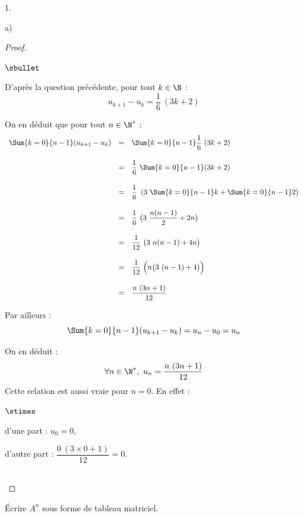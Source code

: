 \begin{noliste}{1.}
\begin{noliste}{a)}
    \begin{proof}~%
      \begin{noliste}{$\sbullet$}
      \item D'après la question précédente, pour tout $k \in \N$ :
        \[
        u_{k+1} - u_k = \dfrac{1}{6} \ (3k + 2)
        \]
      \item On en déduit que pour tout $n \in \N^*$ : 
        \[
        \begin{array}{rcl}
          \Sum{k=0}{n-1} (u_{k+1} - u_k) & = & \Sum{k=0}{n-1}
          \dfrac{1}{6} \ (3k + 2) 
          \\[.6cm]
          & = & \dfrac{1}{6} \ \Sum{k=0}{n-1} (3k + 2) 
          \\[.6cm]
          & = & \dfrac{1}{6} \ \left(3 \ \Sum{k=0}{n-1} k +
            \Sum{k=0}{n-1} 2 \right) 
          \\[.6cm]
          & = & \dfrac{1}{6} \ \big(3 \ \dfrac{n(n-1)}{2} + 2 n \big) 
          \\[.6cm]
          & = & \dfrac{1}{12} \ \big(3 \ n(n-1) + 4 n \big) 
          \\[.6cm]
          & = & \dfrac{1}{12} \ \Big( n \big(3 \ (n-1) + 4 \big) \Big) 
          \\[.6cm]
          & = & \dfrac{n \ (3n+1)}{12}
        \end{array}
        \]
      \item Par ailleurs :  
        \[
        \Sum{k=0}{n-1} (u_{k+1} - u_k) = u_n - u_0 = u_n
        \]        
      \item On en déduit : 
        \[ 
        \forall n \in \N^*, \ u_n = \dfrac{n \ (3n+1)}{12}
        \] 
        Cette relation est aussi vraie pour $n = 0$. En effet :
        \begin{noliste}{$\stimes$}
        \item d'une part : $u_0 = 0$,
        \item d'autre part : $\dfrac{0 \ (3 \times 0+1)}{12} = 0$.
        \end{noliste} 
      \end{noliste}
      ~\\[-1cm]
    \end{proof}


    \newpage


  \item Écrire $A^{n}$ sous forme de tableau matriciel.


\end{noliste}
\end{noliste}
